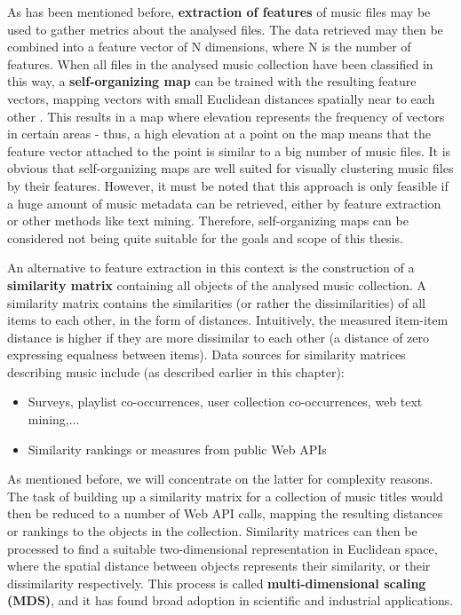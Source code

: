 As has been mentioned before, \textbf{extraction of features} of music files may be used to gather metrics
about the analysed files. The data retrieved may then be combined into a feature vector of N dimensions,
where N is the number of features. When all files in the analysed music collection have been classified in
this way, a \textbf{self-organizing map} can be trained with the resulting feature vectors, mapping 
vectors with small Euclidean distances spatially near to each other \cite{RAU_02ismir}. This results
in a map where elevation represents the frequency of vectors in certain areas - thus, a high elevation
at a point on the map means that the feature vector attached to the point is similar to a big number of music
files. It is obvious that self-organizing maps are well suited for visually clustering music files by their 
features. However, it must be noted that this approach is only feasible if a huge amount of music metadata 
can be retrieved, either by feature extraction or other methods like text mining. Therefore, self-organizing 
maps can be considered not being quite suitable for the goals and scope of this thesis.

An alternative to feature extraction in this context is the construction of a 
\textbf{similarity matrix} containing all objects of the analysed music collection. A similarity matrix contains
the similarities (or rather the dissimilarities) of all items to each other, in the form of distances.
Intuitively, the measured item-item distance is higher if they are more dissimilar to each other (a distance of
zero expressing equalness between items). Data sources for similarity matrices describing music include 
(as described earlier in this chapter):
\begin{itemize}
	\item Surveys, playlist co-occurrences, user collection co-occurrences, web text mining,... 
	\item Similarity rankings or measures from public Web APIs
\end{itemize}
As mentioned before, we will concentrate on the latter for complexity reasons. The task of building up a 
similarity matrix for a collection of music titles would then be reduced to a number of Web API calls, mapping the
resulting distances or rankings to the objects in the collection. Similarity matrices can then be processed
to find a suitable two-dimensional representation in Euclidean space, where the spatial distance between
objects represents their similarity, or their dissimilarity respectively. This process is called \textbf{multi-dimensional scaling (MDS)}, and it has found broad adoption in scientific and industrial applications. 

